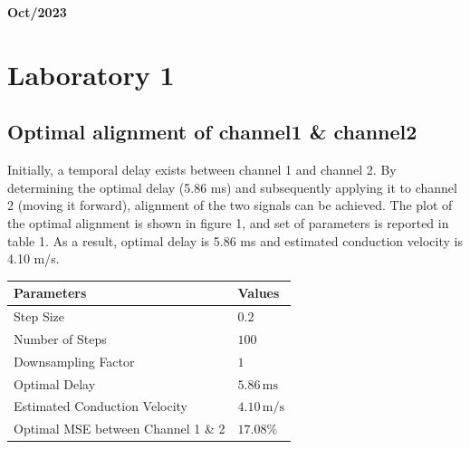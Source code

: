 \documentclass[8pt]{article}  %
\theoremstyle{plain}
\theoremstyle{definition}
\theoremstyle{remark}
\begin{document}
    
    \small{}

    \begin{flushright}
    \textbf{Oct/2023}
    \end{flushright}
    
    \section{Laboratory 1}
    
    \subsection{Optimal alignment of channel1 \& channel2} 
    \begin{minipage}{0.48\textwidth}  
        Initially, a temporal delay exists between channel 1 and channel 2.
        By determining the optimal delay (5.86 ms) and subsequently applying it to channel 2 (moving it forward), alignment of the two signals can be achieved.
        The plot of the optimal alignment is shown in figure 1, and set of parameters is reported in table 1.
        As a result, optimal delay is 5.86 ms and estimated conduction velocity is 4.10 m/s.
    \vspace{0.3cm}

    \begin{tabular}{|l|l|}  
    \hline
    Parameters & Values \\
    \hline
    Step Size & \(0.2\) \\
    Number of Steps & \(100\) \\
    Downsampling Factor & \(1\) \\
    Optimal Delay & \(5.86 \, \text{ms}\) \\
    Estimated Conduction Velocity & \(4.10 \, \text{m/s}\) \\
    Optimal MSE between Channel 1 \& 2 & \(17.08\%\) \\
    \hline
    \end{tabular} 
    
    \end{minipage}
    \hfill
\end{document}
